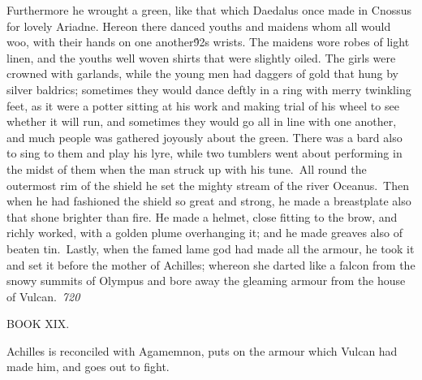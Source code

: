 {Furthermore he wrought a green, like that which Daedalus once made in Cnossus for lovely Ariadne. Hereon there danced youths and maidens whom all would woo, with their hands on one another\'92s wrists. The maidens wore robes of light linen, and the youths well woven shirts that were slightly oiled. The girls were crowned with garlands, while the young men had daggers of gold that hung by silver baldrics; sometimes they would dance deftly in a ring with merry twinkling feet, as it were a potter sitting at his work and making trial of his wheel to see whether it will run, and sometimes they would go all in line with one another, and much people was gathered joyously about the green. There was a bard also to sing to them and play his lyre, while two tumblers went about performing in the midst of them when the man struck up with his tune.\
All round the outermost rim of the shield he set the mighty stream of the river Oceanus.\
Then when he had fashioned the shield so great and strong, he made a breastplate also that shone brighter than fire. He made a helmet, close fitting to the brow, and richly worked, with a golden plume overhanging it; and he made greaves also of beaten tin.\
Lastly, when the famed lame god had made all the armour, he took it and set it before the mother of Achilles; whereon she darted like a falcon from the snowy summits of Olympus and bore away the gleaming armour from the house of Vulcan.\
\pard{}\sl720\qc{}

\fs48  BOOK XIX.\
\pard{}\li1710\ri1710\sa64\qj\partightenfactor0

\fs25\fsmilli12800 \cf2 Achilles is reconciled with Agamemnon, puts on the armour which Vulcan had made him, and goes out to fight.\
\pard\pardeftab720\qj{}

}
